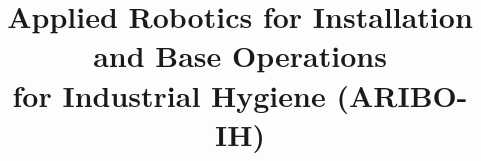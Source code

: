 \title{\LARGE \bf
Applied Robotics for Installation and Base Operations \\for Industrial Hygiene (ARIBO-IH)}




